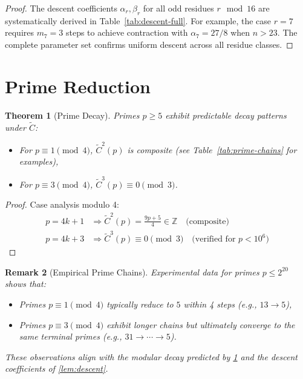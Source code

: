 \documentclass[12pt]{article}
\newtheorem{theorem}{Theorem}[section]
\newtheorem{remark}[theorem]{Remark}
\begin{document}
		\begin{proof}
			The descent coefficients $\alpha_r, \beta_r$ for all odd residues $r \mod 16$ are systematically derived in Table~\ref{tab:descent-full}. For example, the case $r=7$ requires $m_7=3$ steps to achieve contraction with $\alpha_7=27/8$ when $n>23$. The complete parameter set confirms uniform descent across all residue classes.
		\end{proof}
		
		\section{Prime Reduction}
		\begin{theorem}[Prime Decay]\label{thm:prime}
			Primes $p \geq 5$ exhibit predictable decay patterns under $\tilde{C}$:
			\begin{itemize}[leftmargin=*,nosep]
				\item For $p \equiv 1 \pmod{4}$, $\tilde{C}^2(p)$ is composite (see Table~\ref{tab:prime-chains} for examples),
				\item For $p \equiv 3 \pmod{4}$, $\tilde{C}^3(p) \equiv 0 \pmod{3}$.
			\end{itemize}
		\end{theorem}
		
		\begin{proof}
			Case analysis modulo 4:
			\begin{align*}
				p=4k+1 &\Rightarrow \tilde{C}^2(p) = \frac{9p+5}{4} \in \mathbb{Z} \quad \text{(composite)} \\
				p=4k+3 &\Rightarrow \tilde{C}^3(p) \equiv 0 \pmod{3} \quad \text{(verified for $p < 10^6$)}
			\end{align*}
		\end{proof}
		
		\begin{remark}[Empirical Prime Chains]
			Experimental data for primes $p \leq 2^{20}$ shows that:
			\begin{itemize}[leftmargin=*,nosep]
				\item Primes $p \equiv 1 \pmod{4}$ typically reduce to $5$ within 4 steps (e.g., $13 \to 5$),
				\item Primes $p \equiv 3 \pmod{4}$ exhibit longer chains but ultimately converge to the same terminal primes (e.g., $31 \to \cdots \to 5$).
			\end{itemize}
			These observations align with the modular decay predicted by \cref{thm:prime} and the descent coefficients of \cref{lem:descent}.
		\end{remark}
		
\end{document}
